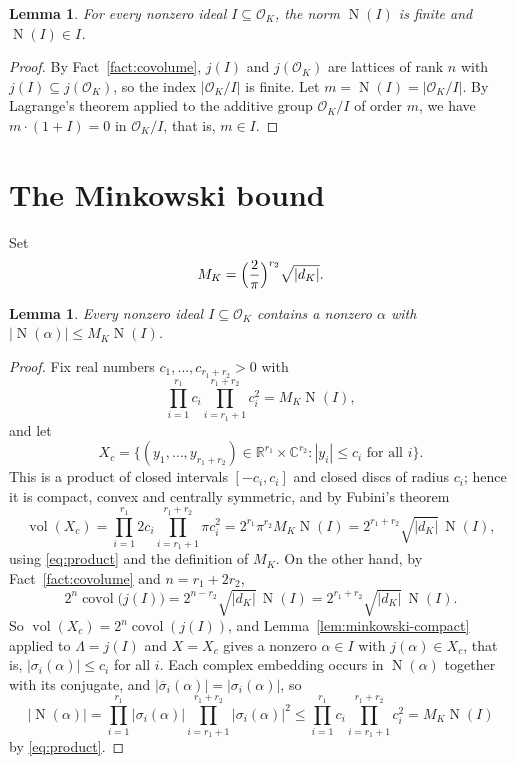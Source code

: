\documentclass[11pt]{amsart}
\newtheorem{lemma}[theorem]{Lemma}
\theoremstyle{definition}
\theoremstyle{remark}
\newcommand{\R}{\mathbb{R}}
\newcommand{\C}{\mathbb{C}}
\newcommand{\OK}{\mathcal{O}_K}
\newcommand{\Nm}{\operatorname{N}}
\newcommand{\vol}{\operatorname{vol}}
\newcommand{\covol}{\operatorname{covol}}
\begin{document}
\begin{lemma}\label{lem:norm-in-ideal}
For every nonzero ideal $I \subseteq \OK$, the norm $\Nm(I)$ is finite and
$\Nm(I) \in I$.
\end{lemma}

\begin{proof}
By Fact~\ref{fact:covolume}, $j(I)$ and $j(\OK)$ are lattices of rank $n$
with $j(I) \subseteq j(\OK)$, so the index $|\OK / I|$ is finite. Let
$m = \Nm(I) = |\OK/I|$. By Lagrange's theorem applied to the additive group
$\OK/I$ of order $m$, we have $m \cdot (1 + I) = 0$ in $\OK/I$, that is,
$m \in I$.
\end{proof}

\section{The Minkowski bound}\label{sec:bound}

Set
\[
  M_K = \Bigl(\frac{2}{\pi}\Bigr)^{r_2} \sqrt{|d_K|}.
\]

\begin{lemma}\label{lem:minkowski-bound}
Every nonzero ideal $I \subseteq \OK$ contains a nonzero $\alpha$ with
$|\Nm(\alpha)| \leq M_K \Nm(I)$.
\end{lemma}

\begin{proof}
Fix real numbers $c_1, \dots, c_{r_1+r_2} > 0$ with
\begin{equation}\label{eq:product}
  \prod_{i=1}^{r_1} c_i \prod_{i=r_1+1}^{r_1+r_2} c_i^2 = M_K \Nm(I),
\end{equation}
and let
\[
  X_c = \bigl\{ (y_1, \dots, y_{r_1+r_2}) \in \R^{r_1} \times \C^{r_2} :
  |y_i| \leq c_i \text{ for all } i \bigr\}.
\]
This is a product of closed intervals $[-c_i, c_i]$ and closed discs of radius
$c_i$; hence it is compact, convex and centrally symmetric, and by Fubini's
theorem
\[
  \vol(X_c) = \prod_{i=1}^{r_1} 2c_i \prod_{i=r_1+1}^{r_1+r_2} \pi c_i^2
  = 2^{r_1} \pi^{r_2} M_K \Nm(I)
  = 2^{r_1 + r_2} \sqrt{|d_K|}\, \Nm(I),
\]
using \eqref{eq:product} and the definition of $M_K$. On the other hand, by
Fact~\ref{fact:covolume} and $n = r_1 + 2r_2$,
\[
  2^n \covol\bigl(j(I)\bigr) = 2^{n - r_2} \sqrt{|d_K|}\, \Nm(I)
  = 2^{r_1 + r_2} \sqrt{|d_K|}\, \Nm(I).
\]
So $\vol(X_c) = 2^n \covol(j(I))$, and Lemma~\ref{lem:minkowski-compact}
applied to
$\Lambda = j(I)$ and $X = X_c$ gives a nonzero $\alpha \in I$ with
$j(\alpha) \in X_c$, that is, $|\sigma_i(\alpha)| \leq c_i$ for all $i$. Each
complex embedding occurs in $\Nm(\alpha)$ together with its conjugate, and
$|\overline{\sigma}_i(\alpha)| = |\sigma_i(\alpha)|$, so
\[
  |\Nm(\alpha)|
  = \prod_{i=1}^{r_1} |\sigma_i(\alpha)|
    \prod_{i=r_1+1}^{r_1+r_2} |\sigma_i(\alpha)|^2
  \leq \prod_{i=1}^{r_1} c_i \prod_{i=r_1+1}^{r_1+r_2} c_i^2
  = M_K \Nm(I)
\]
by \eqref{eq:product}.
\end{proof}
\end{document}
